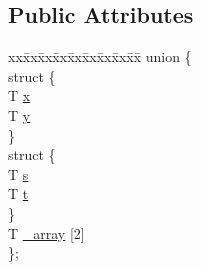\subsection*{Public Attributes}
\begin{CompactItemize}
\item 
\begin{tabbing}
xx\=xx\=xx\=xx\=xx\=xx\=xx\=xx\=xx\=\kill
union \{\\
\>struct \{\\
\>\>T \hyperlink{classnv_1_1vec2_8efadb63b4a29541308b816916d1cb6f}{x}\\
\>\>T \hyperlink{classnv_1_1vec2_e4021bd7f878caa55ecc0727b28a2632}{y}\\
\>\} \\
\>struct \{\\
\>\>T \hyperlink{classnv_1_1vec2_8654481c6586b16f5210f6cc0f04672e}{s}\\
\>\>T \hyperlink{classnv_1_1vec2_6e3af4948e5eb30ffb805b88dd73cc91}{t}\\
\>\} \\
\>T \hyperlink{classnv_1_1vec2_6bd8aa4685ee3e0b042c22572da5a3ff}{\_array} \mbox{[}2\mbox{]}\\
\}; \\

\end{tabbing}\end{CompactItemize}
